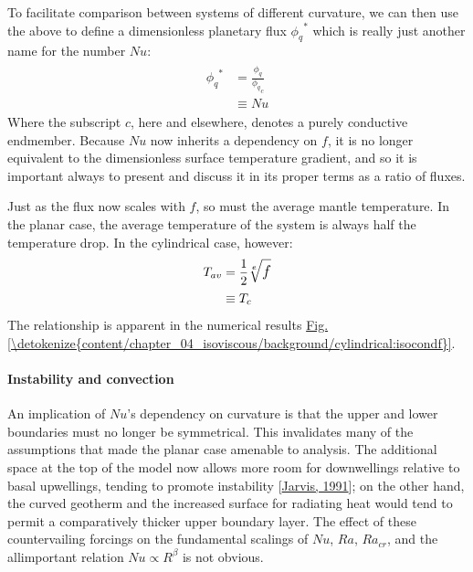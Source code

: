 \documentclass[letterpaper,10pt,english]{jupyterBook}
\begin{document}
\sphinxAtStartPar
To facilitate comparison between systems of different curvature, we can then use the above to define a dimensionless planetary flux \({\phi_q}^{*}\) \sphinxhyphen{} which is really just another name for the  number \(Nu\):
\begin{equation*}
\begin{split} \begin{align*}
{\phi_q}^{*} &= \frac{ {\phi_q} }{ {\phi_q}_c } \\
&\equiv Nu
\end{align*} \end{split}
\end{equation*}
\sphinxAtStartPar
Where the subscript \(c\), here and elsewhere, denotes a purely conductive endmember. Because \(Nu\) now inherits a dependency on \(f\), it is no longer equivalent to the dimensionless surface temperature gradient, and so it is important always to present and discuss it in its proper terms as a ratio of fluxes.

\sphinxAtStartPar
Just as the flux now scales with \(f\), so must the average mantle temperature. In the planar case, the average temperature of the system is always half the temperature drop. In the cylindrical case, however:
\begin{equation*}
\begin{split} \begin{align*}
T_{av} &= \dfrac{1}{2} \large{\root \huge{e} \of f} \\
&\equiv T_{c}
\end{align*} \end{split}
\end{equation*}
\sphinxAtStartPar
The relationship is apparent in the numerical results \hyperref[\detokenize{content/chapter_04_isoviscous/background/cylindrical:isocondf}]{Fig.\@ \ref{\detokenize{content/chapter_04_isoviscous/background/cylindrical:isocondf}}}.


\paragraph{Instability and convection}
\label{\detokenize{content/chapter_04_isoviscous/background/cylindrical:instability-and-convection}}
\sphinxAtStartPar
An implication of \(Nu\)’s dependency on curvature is that the upper and lower boundaries must no longer be symmetrical. This invalidates many of the assumptions that made the planar case amenable to analysis. The additional space at the top of the model now allows more room for downwellings relative to basal upwellings, tending to promote instability {[}\hyperlink{cite.references:id899}{Jarvis, 1991}{]}; on the other hand, the curved geotherm and the increased surface for radiating heat would tend to permit a comparatively thicker upper boundary layer. The effect of these countervailing forcings on the fundamental scalings of \(Nu\), \(Ra\), \(Ra_{cr}\), and the all\sphinxhyphen{}important relation \(Nu \propto R^{\beta}\) is not obvious.
\end{document}
